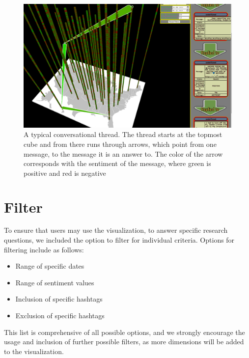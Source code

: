 \begin{figure}
  \includegraphics[width=\linewidth]{figures/example3.PNG}
  \caption{A typical conversational thread. The thread starts at the topmost cube and from there runs through arrows, which point from one message, to the message it is an answer to. The color of the arrow corresponds with the sentiment of the message, where green is positive and red is negative}
  \label{fig:viz4}
\end{figure}

\section{Filter}
To ensure that users may use the visualization, to answer specific research questions, we included the option to filter for individual criteria. Options for filtering include as follows:
\begin{itemize}
    \item Range of specific dates
    \item Range of sentiment values
    \item Inclusion of specific hashtags
    \item Exclusion of specific hashtags
\end{itemize}
This list is comprehensive of all possible options, and we strongly encourage the usage and inclusion of further possible filters, as more dimensions will be added to the visualization.
